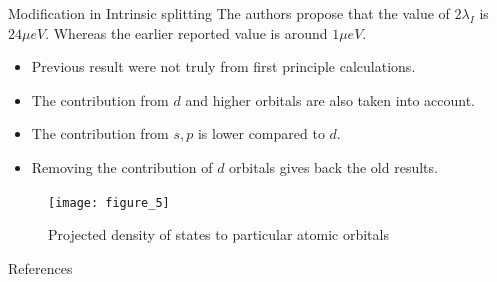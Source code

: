 \documentclass[11pt]{beamer}
\begin{document}
\begin{frame}{Modification in Intrinsic splitting}
The authors propose that the value of $2\lambda_I$ is $24 \mu eV$. Whereas the earlier reported value is around $1\mu eV.$
\begin{itemize}
    \item Previous result were not truly from first principle calculations.
    \item The contribution from $d$ and higher orbitals are also taken into account.
    \item The contribution from $s,p$ is lower compared to $d$.
    \item Removing the contribution of $d$ orbitals gives back the old results.
\end{itemize}
\begin{figure}[h]
    \texttt{[image: figure\_5]}
    \caption{Projected density of states to particular atomic orbitals}
\end{figure}

\end{frame}
\begin{frame}{References}
\printbibliography
\end{frame}
\end{document}
